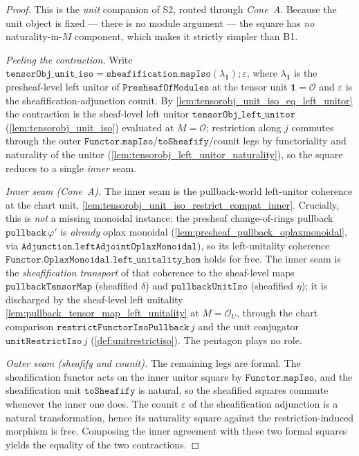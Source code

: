 \begin{proof}
  \leanok
  This is the \emph{unit} companion of S2, routed through \emph{Cone~A}. Because the unit object is
  fixed --- there is no module argument --- the square has \emph{no} naturality-in-\(M\) component,
  which makes it strictly simpler than B1.

  \emph{Peeling the contraction.} Write
  \(\mathtt{tensorObj\_unit\_iso} = \mathtt{sheafification.mapIso}(\lambda_{\mathbf 1})
  \mathbin{;} \varepsilon\), where \(\lambda_{\mathbf 1}\) is the presheaf-level left unitor of
  \(\mathtt{PresheafOfModules}\) at the tensor unit \(\mathbf 1 = \mathcal{O}\) and \(\varepsilon\) is
  the sheafification-adjunction counit. By \cref{lem:tensorobj_unit_iso_eq_left_unitor} the
  contraction is the sheaf-level left unitor \(\mathtt{tensorObj\_left\_unitor}\)
  (\cref{lem:tensorobj_unit_iso}) evaluated at \(M = \mathcal{O}\); restriction along \(j\) commutes
  through the outer \(\mathtt{Functor.mapIso}\)/\(\mathtt{toSheafify}\)/counit legs by functoriality
  and naturality of the unitor (\cref{lem:tensorobj_left_unitor_naturality}), so the square reduces to
  a single \emph{inner} seam.

  \emph{Inner seam (Cone~A).} The inner seam is the pullback-world left-unitor coherence at the chart
  unit, \cref{lem:tensorobj_unit_iso_restrict_compat_inner}. Crucially, this is \emph{not} a missing
  monoidal instance: the presheaf change-of-rings pullback \(\mathtt{pullback}\,\varphi'\) is
  \emph{already} oplax monoidal (\cref{lem:presheaf_pullback_oplaxmonoidal}, via
  \(\mathtt{Adjunction.leftAdjointOplaxMonoidal}\)), so its left-unitality coherence
  \(\mathtt{Functor.OplaxMonoidal.left\_unitality\_hom}\) holds for free. The inner seam is the
  \emph{sheafification transport} of that coherence to the sheaf-level maps
  \(\mathtt{pullbackTensorMap}\) (sheafified \(\delta\)) and \(\mathtt{pullbackUnitIso}\) (sheafified
  \(\eta\)); it is discharged by the sheaf-level left unitality
  \cref{lem:pullback_tensor_map_left_unitality} at \(M = \mathcal{O}_U\), through the chart comparison
  \(\mathtt{restrictFunctorIsoPullback}\,j\) and the unit conjugator \(\mathtt{unitRestrictIso}\,j\)
  (\cref{def:unitrestrictiso}). The pentagon plays no role.

  \emph{Outer seam (sheafify and counit).} The remaining legs are formal. The sheafification functor
  acts on the inner unitor square by \(\mathtt{Functor.mapIso}\), and the sheafification unit
  \(\mathtt{toSheafify}\) is natural, so the sheafified squares commute whenever the inner one does.
  The counit \(\varepsilon\) of the sheafification adjunction is a natural transformation, hence its
  naturality square against the restriction-induced morphism is free. Composing the inner agreement
  with these two formal squares yields the equality of the two contractions.


\end{proof}
